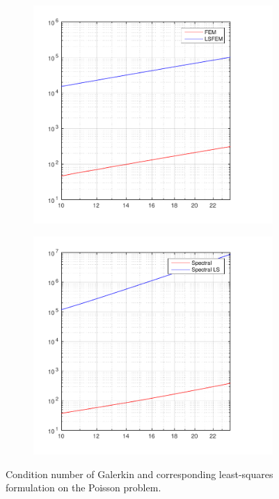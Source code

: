%
\begin{figure}[ht]
  \centering
  \begin{subfigure}[b]{0.48\textwidth}
	\includegraphics[width=\textwidth]{Figures/condFEM-LSFEM.pdf}
  \end{subfigure}%
  \quad
  \begin{subfigure}[b]{0.48\textwidth}
	\includegraphics[width=\textwidth]{Figures/condSpec-SpecLS.pdf}
  \end{subfigure}
  \vspace{-0.1\baselineskip}
  \caption{Condition number of Galerkin and corresponding least-squares formulation on the Poisson problem.}
  \label{fig:ConditionPoisson}
\end{figure}
%
